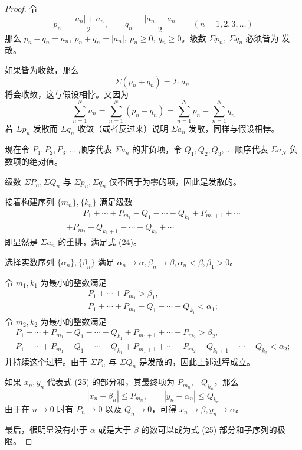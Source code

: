 \documentclass[../poma-notes.tex]{subfiles}
\begin{document}
\begin{proof}
  令
  \[
    p_n = \frac{|a_n|+a_n}{2},\qquad q_n = \frac{|a_n|-a_n}{2} \qquad (n=1,2,3,\dots)
  \]
  那么 $p_n - q_n = a_n,\ p_n + q_n = |a_n|,\ p_n \ge 0,\ q_n \ge 0$。级数 $\Sigma p_n,\ \Sigma q_n$ 必须皆为
  发散。

  如果皆为收敛，那么
  \[
    \Sigma(p_n + q_n) = \Sigma |a_n|
  \]
  将会收敛，这与假设相悖。又因为
  \[
    \sum_{n=1}^{N} a_n = \sum_{n=1}^{N} (p_n - q_n) = \sum_{n=1}^{N} p_n - \sum_{n=1}^{N} q_n
  \]
  若 $\Sigma p_n$ 发散而 $\Sigma q_n$ 收敛（或者反过来）说明 $\Sigma a_n$ 发散，同样与假设相悖。

  现在令 $P_1,P_2,P_3,\dots$ 顺序代表 $\Sigma a_n$ 的非负项，令 $Q_1,Q_2,Q_3,\dots$ 顺序代表 $\Sigma a_N$
  负数项的绝对值。

  级数 $\Sigma P_n, \Sigma Q_n$ 与 $\Sigma p_n, \Sigma q_n$ 仅不同于为零的项，因此是发散的。

  接着构建序列 $\{m_n\}, \{k_n\}$ 满足级数
  \begin{multline}
    \qquad P_1 + \cdots + P_{m_1} - Q_1 - \cdots - Q_{k_1} + P_{m_1 + 1} + \cdots \\
    + P_{m_2} - Q_{k_1 + 1} - \cdots - Q_{k_2} + \cdots \qquad
  \end{multline}
  即显然是 $\Sigma a_n$ 的重排，满足式 (24)。

  选择实数序列 $\{\alpha_n\},\{\beta_n\}$ 满足 $\alpha_n\to\alpha, \beta_n\to\beta, \alpha_n<\beta, \beta_1>0$。

  令 $m_1, k_1$ 为最小的整数满足
  \begin{gather*}
    P_1 + \cdots + P_{m_1} > \beta_1, \\
    P_1 + \cdots + P_{m_1} - Q_1 - \cdots - Q_{k_1} < \alpha_1;
  \end{gather*}
  令 $m_2, k_2$ 为最小的整数满足
  \begin{gather*}
    P_1 + \cdots + P_{m_1} - Q_1 - \cdots - Q_{k_1} + P_{m_1+1} + \cdots + P_{m_2} > \beta_2, \\
    P_1 + \cdots + P_{m_1} - Q_1 - \cdots - Q_{k_1} + P_{m_1+1} + \cdots + P_{m_2} - Q_{k_1+1} -
    \cdots - Q_{k_2} < \alpha_2;
  \end{gather*}
  并持续这个过程。由于 $\Sigma P_n$ 与 $\Sigma Q_n$ 是发散的，因此上述过程成立。

  如果 $x_n, y_n$ 代表式 (25) 的部分和，其最终项为 $P_{m_n}, -Q_{k_n}$，那么
  \[
    |x_n - \beta_n| \le P_{m_n},\qquad |y_n - \alpha_n| \le Q_{k_n}
  \]
  由于在 $n \to 0$ 时有 $P_n \to 0$ 以及 $Q_n \to 0$，可得 $x_n \to \beta, y_n \to \alpha$。

  最后，很明显没有小于 $\alpha$ 或是大于 $\beta$ 的数可以成为式 (25) 部分和子序列的极限。
\end{proof}
\end{document}
